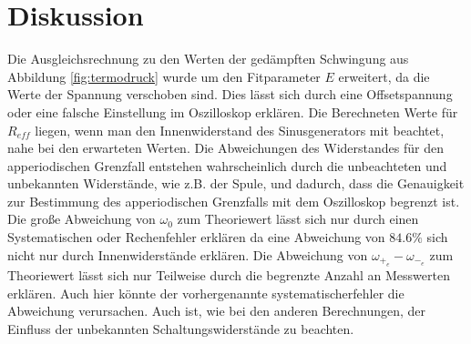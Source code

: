 \section{Diskussion}
\label{sec:Diskussion}
Die Ausgleichsrechnung zu den Werten der gedämpften Schwingung aus Abbildung
\ref{fig:termodruck} wurde um den Fitparameter $E$ erweitert, da die Werte
der Spannung verschoben sind. Dies lässt sich durch eine Offsetspannung oder
eine falsche Einstellung im Oszilloskop erklären.
Die Berechneten Werte für $R_{eff}$ liegen, wenn man den Innenwiderstand des
Sinusgenerators mit beachtet, nahe bei den erwarteten Werten. Die
Abweichungen des Widerstandes für den apperiodischen Grenzfall entstehen
wahrscheinlich durch die unbeachteten und unbekannten Widerstände, wie z.B.
der Spule, und dadurch, dass die Genauigkeit zur Bestimmung des apperiodischen
Grenzfalls mit dem Oszilloskop begrenzt ist. Die große Abweichung von $\omega_0$
zum Theoriewert lässt sich nur durch einen Systematischen oder Rechenfehler erklären
da eine Abweichung von $84.6\%$ sich nicht nur durch Innenwiderstände erklären.
Die Abweichung von
$\omega_{+_e}-\omega_{-_e}$ zum Theoriewert lässt sich nur Teilweise durch die
begrenzte Anzahl an Messwerten erklären. Auch hier könnte der vorhergenannte
 systematischerfehler die Abweichung verursachen.
Auch ist, wie bei den anderen
Berechnungen, der Einfluss der unbekannten Schaltungswiderstände zu beachten.
